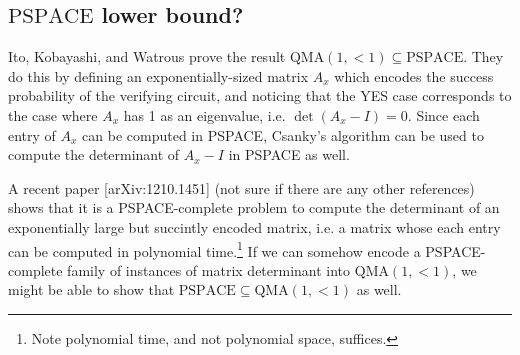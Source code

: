 \documentclass[english]{article}
\numberwithin{equation}{section}
\numberwithin{figure}{section}
\theoremstyle{plain}
\theoremstyle{definition}
\theoremstyle{plain}
\theoremstyle{definition}
\theoremstyle{remark}
\theoremstyle{remark}
\theoremstyle{plain}
\begin{document}
\subsection{$\text{PSPACE}$ lower bound?}
Ito, Kobayashi, and Watrous prove the result $\text{QMA}(1,<1)\subseteq\text{PSPACE}$. They do this by defining an exponentially-sized matrix $A_x$ which encodes the success probability of the verifying circuit, and noticing that the YES case corresponds to the case where $A_x$ has 1 as an eigenvalue, i.e. $\det(A_x-I)=0$. Since each entry of $A_x$ can be computed in PSPACE, Csanky's algorithm can be used to compute the determinant of $A_x-I$ in PSPACE as well.

A recent paper [arXiv:1210.1451] (not sure if there are any other references) shows that it is a PSPACE-complete problem to compute the determinant of an exponentially large but succintly encoded matrix, i.e. a matrix whose each entry can be computed in polynomial time.\footnote{Note polynomial time, and not polynomial space, suffices.} If we can somehow encode a PSPACE-complete family of instances of matrix determinant into $\text{QMA}(1,<1)$, we might be able to show that $\text{PSPACE} \subseteq \text{QMA}(1,<1)$ as well.
\end{document}
